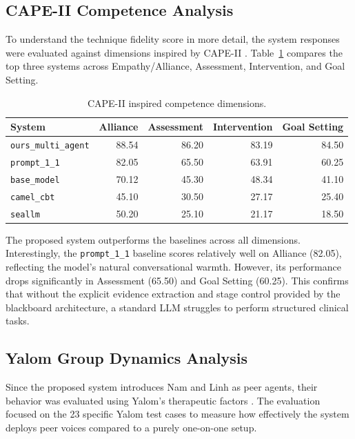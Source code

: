 \subsection{CAPE-II Competence Analysis}

To understand the technique fidelity score in more detail, the system responses were evaluated against dimensions inspired by CAPE-II \citep{Sobowale2025CAPEII}. Table~\ref{tab:cape2_results} compares the top three systems across Empathy/Alliance, Assessment, Intervention, and Goal Setting.

\begin{table}[H]
\centering
\caption{CAPE-II inspired competence dimensions.}
\label{tab:cape2_results}
\small
\begin{tabular}{@{}lrrrr@{}}
\toprule
System & Alliance & Assessment & Intervention & Goal Setting \\
\midrule
\texttt{ours\_multi\_agent} & 88.54 & 86.20 & 83.19 & 84.50 \\
\texttt{prompt\_1\_1} & 82.05 & 65.50 & 63.91 & 60.25 \\
\texttt{base\_model} & 70.12 & 45.30 & 48.34 & 41.10 \\
\texttt{camel\_cbt} & 45.10 & 30.50 & 27.17 & 25.40 \\
\texttt{seallm} & 50.20 & 25.10 & 21.17 & 18.50 \\
\bottomrule
\end{tabular}
\end{table}

The proposed system outperforms the baselines across all dimensions. Interestingly, the \texttt{prompt\_1\_1} baseline scores relatively well on Alliance (82.05), reflecting the model's natural conversational warmth. However, its performance drops significantly in Assessment (65.50) and Goal Setting (60.25). This confirms that without the explicit evidence extraction and stage control provided by the blackboard architecture, a standard LLM struggles to perform structured clinical tasks.

\subsection{Yalom Group Dynamics Analysis}

Since the proposed system introduces Nam and Linh as peer agents, their behavior was evaluated using Yalom's therapeutic factors \citep{Yalom2020GroupPsychotherapy}. The evaluation focused on the 23 specific Yalom test cases to measure how effectively the system deploys peer voices compared to a purely one-on-one setup.

